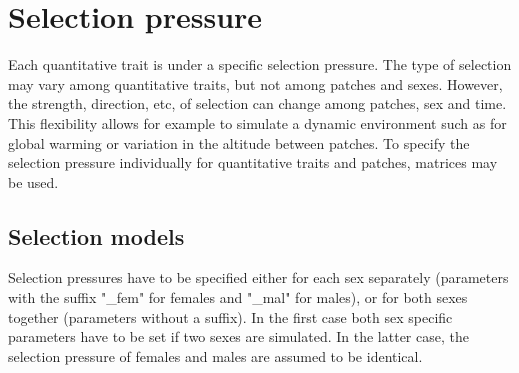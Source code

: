 \documentclass[letterpaper,12pt,oneside]{book}
\begin{document}
\section{Selection pressure}\label{sec:SelectionPressure}
Each quantitative trait is under a specific selection pressure. The type of selection may vary among quantitative traits, but not among patches and sexes. However, the strength, direction, etc,  of selection can change among patches, sex and time. This flexibility allows for example to simulate a dynamic environment such as for global warming or variation in the altitude between patches. To specify the selection pressure individually for quantitative traits and patches, matrices may be used. 
\subsection{Selection models}\label{sub:SelectionModels}
Selection pressures have to be specified either for each sex separately (parameters with the suffix "\_fem" for females and "\_mal" for males), or for both sexes together (parameters without a suffix). In the first case both sex specific parameters have to be set if two sexes are simulated. In the latter case, the selection pressure of females and males are assumed to be identical.
\end{document}
